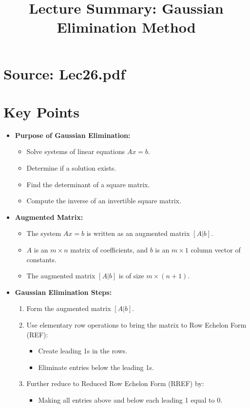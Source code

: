 \documentclass{article}
\title{Lecture Summary: Gaussian Elimination Method}
\author{}
\date{}
\begin{document}
\maketitle

\section*{Source: Lec26.pdf}

\section*{Key Points}

\begin{itemize}
  \item \textbf{Purpose of Gaussian Elimination:}
    \begin{itemize}
      \item Solve systems of linear equations $Ax = b$.
      \item Determine if a solution exists.
      \item Find the determinant of a square matrix.
      \item Compute the inverse of an invertible square matrix.
    \end{itemize}

  \item \textbf{Augmented Matrix:}
    \begin{itemize}
      \item The system $Ax = b$ is written as an augmented matrix $[A|b]$.
      \item $A$ is an $m \times n$ matrix of coefficients, and $b$ is an $m \times 1$ column vector of constants.
      \item The augmented matrix $[A|b]$ is of size $m \times (n+1)$.
    \end{itemize}

  \item \textbf{Gaussian Elimination Steps:}
    \begin{enumerate}
      \item Form the augmented matrix $[A|b]$.
      \item Use elementary row operations to bring the matrix to Row Echelon Form (REF):
        \begin{itemize}
          \item Create leading 1s in the rows.
          \item Eliminate entries below the leading 1s.
        \end{itemize}
      \item Further reduce to Reduced Row Echelon Form (RREF) by:
        \begin{itemize}
          \item Making all entries above and below each leading 1 equal to 0.
        \end{itemize}
    \end{enumerate}


\end{itemize}
\end{document}
